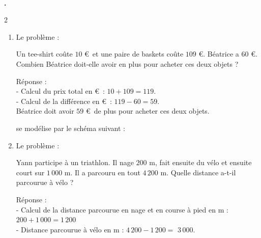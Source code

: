 \documentclass[10pt,a4paper]{article}
\newcounter{exo}
\newcommand{\exo}[1][]{%
  \refstepcounter{exo}%
  \textbf{\textcolor{Couleur8}{\\[0.3cm]\theexo.}}%
  \if\relax\detokenize{#1}\relax\else\ \textbf{#1}\fi\ %
}
\begin{document}
\exo 
\vspace{-0.85cm}
\begin{multicols}{2}
\begin{enumerate}[itemsep=1em]
\item Le problème :

\medskip
Un tee-shirt coûte $10$ €~et une paire de baskets coûte $109$ €. Béatrice a $60$ €. Combien Béatrice doit-elle avoir en plus pour acheter ces deux objets ?

\medskip

  Réponse :\\
  - Calcul du prix total en €~: $10+109=119$.\\
  - Calcul de la différence en €~: $119-60=59$.\\
  Béatrice doit avoir $59$ €~de plus pour acheter ces deux objets.

\medskip

  se modélise par le schéma suivant :

\medskip

\item Le problème :

\medskip
Yann participe à un triathlon. Il nage $200$ m, fait ensuite du vélo et ensuite court sur $1\,000$ m. Il a parcouru en tout $4\,200$ m. Quelle distance a-t-il parcourue à vélo ?

\medskip

      Réponse :\\
      - Calcul de la distance parcourue en nage et en course à pied en m : $200+1\,000=1\,200$\\
      - Distance parcourue à vélo en m : $4\,200-1\,200=$ $3\,000$.

\medskip


\end{enumerate}
\end{multicols}
\end{document}
